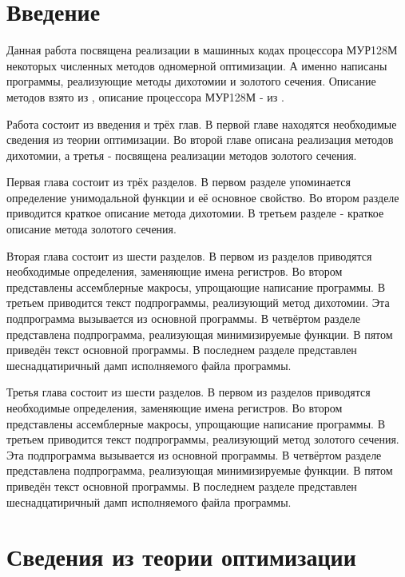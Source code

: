 \documentclass[12pt,a4paper,oneside]{report}
\begin{document}
\tableofcontents
\setcounter{page}{2}

\chapter*{Введение}
Данная работа посвящена реализации в машинных кодах процессора МУР128М некоторых численных методов одномерной оптимизации. А именно написаны программы, реализующие методы дихотомии и золотого сечения. Описание методов взято из \cite{Vasil'ev}, описание процессора МУР128М - из \cite{mur128}.

Работа состоит из введения и трёх глав. В первой главе находятся необходимые сведения из теории оптимизации. Во второй главе описана реализация методов дихотомии, а третья - посвящена реализации методов золотого сечения.

Первая глава состоит из трёх разделов. В первом разделе упоминается определение унимодальной функции и её основное свойство. Во втором разделе приводится краткое описание метода дихотомии. В третьем разделе - краткое описание метода золотого сечения.

Вторая глава состоит из шести разделов. В первом из разделов приводятся необходимые определения, заменяющие имена регистров. Во втором представлены ассемблерные макросы, упрощающие написание программы. В третьем приводится текст подпрограммы, реализующий метод дихотомии. Эта подпрограмма вызывается из основной программы. В четвёртом разделе представлена подпрограмма, реализующая минимизируемые функции. В пятом приведён текст основной программы. В последнем разделе представлен шеснадцатиричный дамп исполняемого файла программы.

Третья глава состоит из шести разделов. В первом из разделов приводятся необходимые определения, заменяющие имена регистров. Во втором представлены ассемблерные макросы, упрощающие написание программы. В третьем приводится текст подпрограммы, реализующий метод золотого сечения. Эта подпрограмма вызывается из основной программы. В четвёртом разделе представлена подпрограмма, реализующая минимизируемые функции. В пятом приведён текст основной программы. В последнем разделе представлен шеснадцатиричный дамп исполняемого файла программы.


\chapter{Сведения из теории оптимизации}
\end{document}
